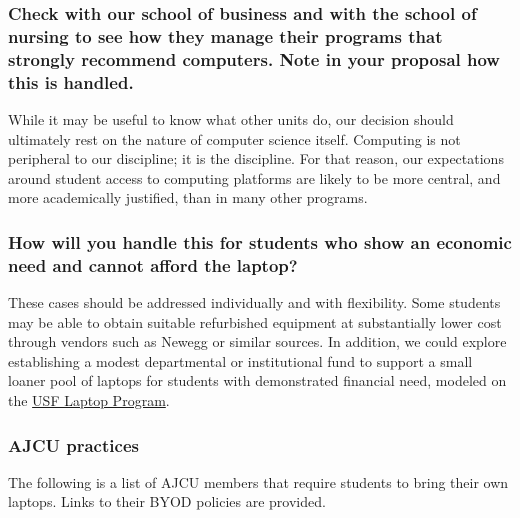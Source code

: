 \subsubsection*{Check with our school of business and with the school of nursing to see how they manage their programs that strongly recommend computers. Note in your proposal how this is handled.} 

While it may be useful to know what other units do, our decision should ultimately rest on the nature of computer science itself. Computing is not peripheral to our discipline; it is the discipline. For that reason, our expectations around student access to computing platforms are likely to be more central, and more academically justified, than in many other programs.

\subsubsection*{How will you handle this for students who show an economic need and cannot afford the laptop?} 

These cases should be addressed individually and with flexibility. Some students may be able to obtain suitable refurbished equipment at substantially lower cost through vendors such as Newegg or similar sources. In addition, we could explore establishing a modest departmental or institutional fund to support a small loaner pool of laptops for students with demonstrated financial need, modeled on  the \href{https://myusf.usfca.edu/dean-of-students/laptop-program}{USF Laptop Program}.

\subsubsection*{AJCU practices} 

The following is a list of AJCU members that require students to bring their own laptops. Links to their BYOD policies are provided.


